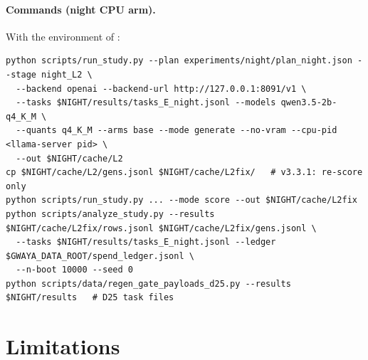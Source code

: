 \documentclass[11pt,a4paper]{article}
\newcommand{\code}[1]{\texttt{\detokenize{#1}}}
\begin{document}
\paragraph{Commands (night CPU arm).} With the environment of \code{night/run_L2.sh}:
{\scriptsize
\begin{verbatim}
python scripts/run_study.py --plan experiments/night/plan_night.json --stage night_L2 \
  --backend openai --backend-url http://127.0.0.1:8091/v1 \
  --tasks $NIGHT/results/tasks_E_night.jsonl --models qwen3.5-2b-q4_K_M \
  --quants q4_K_M --arms base --mode generate --no-vram --cpu-pid <llama-server pid> \
  --out $NIGHT/cache/L2
cp $NIGHT/cache/L2/gens.jsonl $NIGHT/cache/L2fix/   # v3.3.1: re-score only
python scripts/run_study.py ... --mode score --out $NIGHT/cache/L2fix
python scripts/analyze_study.py --results $NIGHT/cache/L2fix/rows.jsonl $NIGHT/cache/L2fix/gens.jsonl \
  --tasks $NIGHT/results/tasks_E_night.jsonl --ledger $GWAYA_DATA_ROOT/spend_ledger.jsonl \
  --n-boot 10000 --seed 0
python scripts/data/regen_gate_payloads_d25.py --results $NIGHT/results   # D25 task files
\end{verbatim}}

\section{Limitations}\label{sec:limits}
\end{document}
